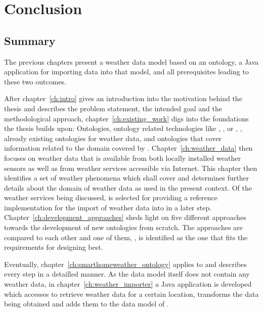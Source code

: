 \chapter{Conclusion}
\label{ch:conclusion}

\section{Summary}

The previous chapters present a weather data model based on an  ontology, a Java application for importing data into that model, and all prerequisites leading to these two outcomes.

After chapter~\ref{ch:intro} gives an introduction into the motivation behind the thesis and describes the problem statement, the intended goal and the methodological approach, chapter~\ref{ch:existing_work} digs into the foundations the thesis builds upon: Ontologies, ontology related technologies like , , or , \thinkhome, already existing ontologies for weather data, and ontologies that cover information related to the domain covered by \smarthomeweather. Chapter~\ref{ch:weather_data} then focuses on weather data that is available from both locally installed weather sensors as well as from weather services accessible via Internet. This chapter then identifies a set of weather phenomena which \smarthomeweather shall cover and determines further details about the domain of weather data as used in the present context.
Of the weather services being discussed, \yrno is selected for providing a reference implementation for the import of weather data into \smarthomeweather in a later step. Chapter~\ref{ch:development_approaches} sheds light on five different approaches towards the development of new ontologies from scratch. The approaches are compared to each other and one of them, \methontology, is identified as the one that fits the requirements for designing \smarthomeweather best.

Eventually, chapter~\ref{ch:smarthomeweather_ontology} applies \methontology to \smarthomeweather and describes every step in a detailled manner. As the data model itself does not contain any weather data, in chapter~\ref{ch:weather_importer} a Java application is developed which accesses \yrno to retrieve weather data for a certain location, transforms the data being obtained and adds them to the data model of \smarthomeweather.

